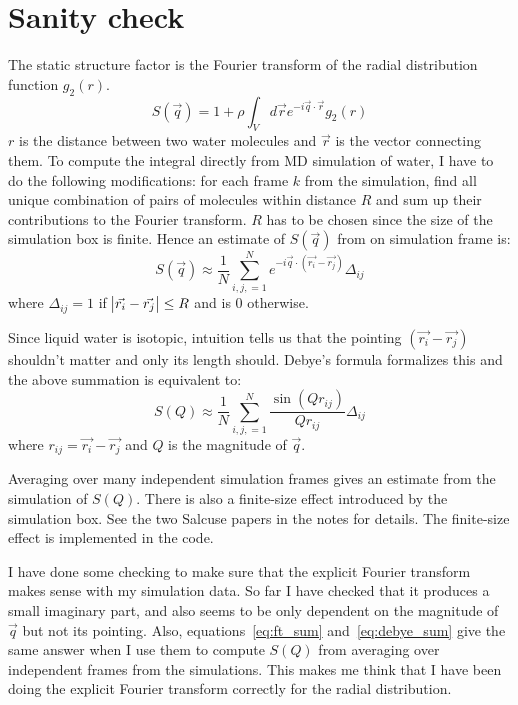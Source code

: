 \documentclass[20pt]{article}
\begin{document}
\section{Sanity check}
The static structure factor is the Fourier transform of the radial distribution function $g_2(r)$.
\begin{equation} \label{eq:ft_g}
S(\vec{q}) = 1+ \rho \int_V d\vec{r} e^{-i \vec{q} \cdot \vec{r}} g_2(r)
\end{equation} 
$r$ is the distance between two water molecules and $\vec{r}$ is the vector connecting them. To compute the integral directly from MD simulation of water, I have to do the following modifications: for each frame $k$ from the simulation, find all unique combination of pairs of molecules within distance $R$ and sum up their contributions to the Fourier transform. $R$ has to be chosen since the size of the simulation box is finite. Hence an estimate of $S(\vec{q})$ from on simulation frame is:
\begin{equation} \label{eq:ft_sum}
S(\vec{q})\approx\frac{1}{N} \sum_{i,j, =1}^{N}  e^{-i \vec{q} \cdot (\vec{r_i}-\vec{r_j})}  \Delta_{ij}
\end{equation}
where $\Delta_{ij} = 1$ if $\abs{\vec{r_i}-\vec{r_j}} \leq R$ and is 0 otherwise.

Since liquid water is isotopic, intuition tells us that the pointing $(\vec{r_i}-\vec{r_j})$ shouldn't matter and only its length should. Debye's formula formalizes this and the above summation is equivalent to:
\begin{equation} \label{eq:debye_sum}
S(Q)\approx\frac{1}{N} \sum_{i,j, =1}^{N}  \frac{\sin(Qr_{ij})}{Qr_{ij}}  \Delta_{ij}
\end{equation}
where $r_{ij}= \vec{r_i}-\vec{r_j}$ and $Q$ is the magnitude of $\vec{q}$.

Averaging over many independent simulation frames gives an estimate from the simulation of $S(Q)$. There is also a finite-size effect introduced by the simulation box. See the two Salcuse papers in the notes for details. The finite-size effect is implemented in the code. 

I have done some checking to make sure that the explicit Fourier transform makes sense with my simulation data. So far I have checked that it produces a small imaginary part, and also seems to be only dependent on the magnitude of $\vec{q}$ but not its pointing. Also, equations~\ref{eq:ft_sum} and~\ref{eq:debye_sum} give the same answer when I use them to compute $S(Q)$ from averaging over independent frames from the simulations. This makes me think that I have been doing the explicit Fourier transform correctly for the radial distribution.
\end{document}
